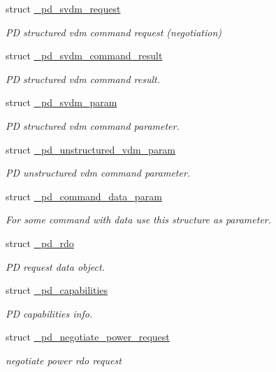 \begin{DoxyCompactItemize}
struct \hyperlink{struct__pd__svdm__request}{\-\_\-pd\-\_\-svdm\-\_\-request}
\begin{DoxyCompactList}\small\item\em P\-D structured vdm command request (negotiation) \end{DoxyCompactList}\item 
struct \hyperlink{struct__pd__svdm__command__result}{\-\_\-pd\-\_\-svdm\-\_\-command\-\_\-result}
\begin{DoxyCompactList}\small\item\em P\-D structured vdm command result. \end{DoxyCompactList}\item 
struct \hyperlink{struct__pd__svdm__param}{\-\_\-pd\-\_\-svdm\-\_\-param}
\begin{DoxyCompactList}\small\item\em P\-D structured vdm command parameter. \end{DoxyCompactList}\item 
struct \hyperlink{struct__pd__unstructured__vdm__param}{\-\_\-pd\-\_\-unstructured\-\_\-vdm\-\_\-param}
\begin{DoxyCompactList}\small\item\em P\-D unstructured vdm command parameter. \end{DoxyCompactList}\item 
struct \hyperlink{struct__pd__command__data__param}{\-\_\-pd\-\_\-command\-\_\-data\-\_\-param}
\begin{DoxyCompactList}\small\item\em For some command with data use this structure as parameter. \end{DoxyCompactList}\item 
struct \hyperlink{struct__pd__rdo}{\-\_\-pd\-\_\-rdo}
\begin{DoxyCompactList}\small\item\em P\-D request data object. \end{DoxyCompactList}\item 
struct \hyperlink{struct__pd__capabilities}{\-\_\-pd\-\_\-capabilities}
\begin{DoxyCompactList}\small\item\em P\-D capabilities info. \end{DoxyCompactList}\item 
struct \hyperlink{struct__pd__negotiate__power__request}{\-\_\-pd\-\_\-negotiate\-\_\-power\-\_\-request}
\begin{DoxyCompactList}\small\item\em negotiate power rdo request \end{DoxyCompactList}\item 

\end{DoxyCompactItemize}
